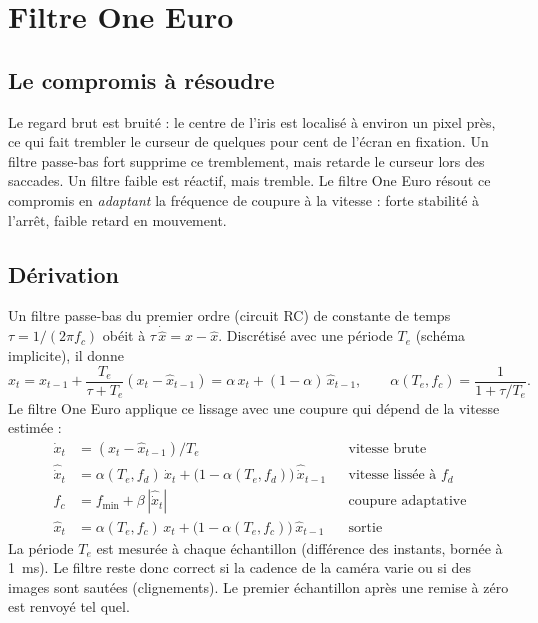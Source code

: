 \section{Filtre One Euro}
\label{sec:oneeuro}

\subsection{Le compromis à résoudre}

Le regard brut est bruité : le centre de l'iris est localisé à environ un pixel près, ce qui fait trembler le curseur de quelques pour cent de l'écran en fixation. Un filtre passe-bas fort supprime ce tremblement, mais retarde le curseur lors des saccades. Un filtre faible est réactif, mais tremble. Le filtre One Euro \cite{casiez2012} résout ce compromis en \emph{adaptant} la fréquence de coupure à la vitesse : forte stabilité à l'arrêt, faible retard en mouvement.

\subsection{Dérivation}

Un filtre passe-bas du premier ordre (circuit RC) de constante de temps $\tau = 1/(2\pi f_c)$ obéit à $\tau\,\dot{\hat x} = x - \hat x$. Discrétisé avec une période $T_e$ (schéma implicite), il donne
\begin{equation}
  \hat x_t = \hat x_{t-1} + \frac{T_e}{\tau + T_e}(x_t - \hat x_{t-1}) = \alpha\,x_t + (1 - \alpha)\,\hat x_{t-1},
  \qquad \alpha(T_e, f_c) = \frac{1}{1 + \tau/T_e} .
\end{equation}
Le filtre One Euro applique ce lissage avec une coupure qui dépend de la vitesse estimée :
\begin{align}
  \dot x_t &= (x_t - \hat x_{t-1})/T_e && \text{vitesse brute} \\
  \hat{\dot x}_t &= \alpha(T_e, f_d)\,\dot x_t + \big(1 - \alpha(T_e, f_d)\big)\,\hat{\dot x}_{t-1} && \text{vitesse lissée à } f_d \\
  f_c &= f_{\min} + \beta\,|\hat{\dot x}_t| && \text{coupure adaptative} \\
  \hat x_t &= \alpha(T_e, f_c)\,x_t + \big(1 - \alpha(T_e, f_c)\big)\,\hat x_{t-1} && \text{sortie}
\end{align}
La période $T_e$ est mesurée à chaque échantillon (différence des instants, bornée à \qty{1}{\milli\second}). Le filtre reste donc correct si la cadence de la caméra varie ou si des images sont sautées (clignements). Le premier échantillon après une remise à zéro est renvoyé tel quel.

